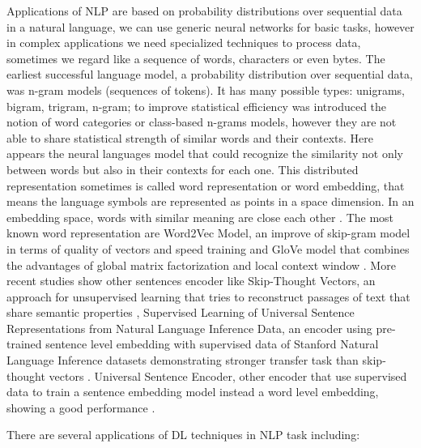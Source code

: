 \documentclass[12pt]{report}
\begin{document}
Applications of \ac{NLP} are based on probability distributions over sequential data in a natural language, we can use generic neural networks for basic tasks, however in complex applications we need specialized techniques to process data, sometimes we regard like a sequence of words, characters or even bytes. The earliest successful language model, a probability distribution over sequential data, was n-gram models (sequences of tokens). It has many possible types: unigrams, bigram, trigram, n-gram; to improve statistical efficiency was introduced the notion of word categories or class-based n-grams models, however they are not able to share statistical strength of similar words and their contexts. Here appears the neural languages model that could recognize the similarity not only between words but also in their contexts for each one. This distributed representation sometimes is called word representation or word embedding, that means the language symbols are represented as points in a space dimension. In an embedding space, words with similar meaning are close each other \cite{Russell2010} \cite{Goodfellow2016}. The most known word representation are Word2Vec Model, an improve of skip-gram model in terms of quality of vectors and speed training \cite{Mikolov2013} and GloVe model that combines the advantages of global matrix factorization and local context window \cite{Pennington2014}. More recent studies show other sentences encoder like Skip-Thought Vectors, an approach for unsupervised learning that tries to reconstruct passages of text that share semantic properties \cite{Kiros2015}, Supervised Learning of Universal Sentence Representations from Natural Language Inference Data, an encoder using pre-trained sentence level embedding with supervised data of Stanford Natural Language Inference datasets demonstrating stronger transfer task than skip-thought vectors \cite{ Conneau2017}. Universal Sentence Encoder, other encoder that use supervised data to train a sentence embedding model instead a word level embedding, showing a good performance \cite{Cer2018}. 

There are several applications of \ac{DL} techniques in \ac{NLP} task including:
\end{document}
